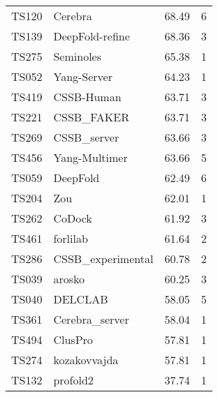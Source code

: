\begin{table*}[ht]
\begin{minipage}[t]{0.48\textwidth}
\begin{tabular}{llrr}
TS120 & Cerebra & 68.49 & 6 \\ 
TS139 & DeepFold-refine & 68.36 & 3 \\ 
TS275 & Seminoles & 65.38 & 1 \\ 
TS052 & Yang-Server & 64.23 & 1 \\ 
TS419 & CSSB-Human & 63.71 & 3 \\ 
TS221 & CSSB\_FAKER & 63.71 & 3 \\ 
TS269 & CSSB\_server & 63.66 & 3 \\ 
TS456 & Yang-Multimer & 63.66 & 5 \\ 
TS059 & DeepFold & 62.49 & 6 \\ 
TS204 & Zou & 62.01 & 1 \\ 
TS262 & CoDock & 61.92 & 3 \\ 
TS461 & forlilab & 61.64 & 2 \\ 
TS286 & CSSB\_experimental & 60.78 & 2 \\ 
TS039 & arosko & 60.25 & 3 \\ 
TS040 & DELCLAB & 58.05 & 5 \\ 
TS361 & Cerebra\_server & 58.04 & 1 \\ 
TS494 & ClusPro & 57.81 & 1 \\ 
TS274 & kozakovvajda & 57.81 & 1 \\ 
TS132 & profold2 & 37.74 & 1 \\ 
\bottomrule
\end{tabular}
\end{minipage}
\end{table*}

